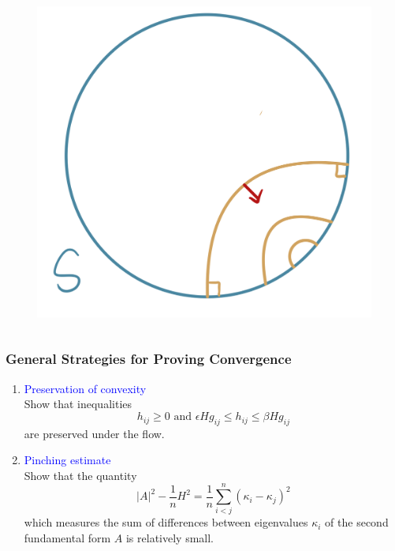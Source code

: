 \documentclass[pdf]{beamer}
\begin{document}
\begin{frame}
\begin{columns}[T]
\begin{column}{.35\textwidth}
            \begin{figure}[h]
                \includegraphics[scale=0.12]{StCon.png}
            \end{figure}
                
                
                \end{column}
            \end{columns}

        
    \end{frame}

    \begin{frame}
        \frametitle{General Strategies for Proving Convergence}
        
        \begin{enumerate}
            \item \textcolor{blue}{Preservation of convexity}\\
            Show that inequalities
            \[h_{ij}^{} \geq 0 \text{ and }\epsilon H g_{ij }^{} \leq h_{ij }^{} \leq \beta H g_{ij }^{} \]
            are preserved under the flow.
            \item \textcolor{blue}{Pinching estimate}\\
            Show that the quantity
            \[\left| A \right| ^2-\frac{1}{n}H^2=\frac{1}{n}\sum_{i<j}^{n}(\kappa _i-\kappa _j)^2\]
            which measures the sum of differences between eigenvalues $\kappa _i$ of the second fundamental form $A$ is relatively small.
        \end{enumerate}
        
    \end{frame}
\end{document}
